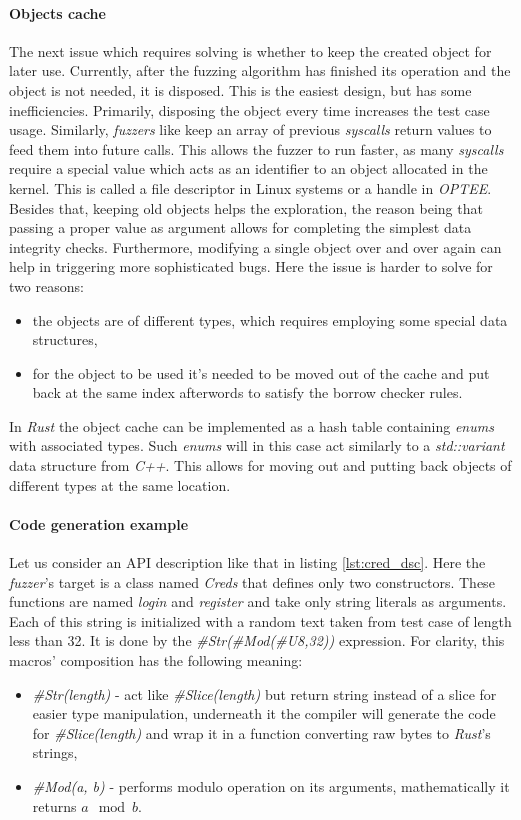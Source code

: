 \paragraph{Objects cache}
The next issue which requires solving is whether to keep the created object for later use. Currently, after the fuzzing algorithm has finished its operation and the object is not needed, it is disposed. This is the easiest design, but has some inefficiencies. Primarily, disposing the object every time increases the test case usage. Similarly, \textit{fuzzers} like \cite{opteefuzz} keep an array of previous \textit{syscalls} return values to feed them into future calls. This allows the fuzzer to run faster, as many \textit{syscalls} require a special value which acts as an identifier to an object allocated in the kernel. This is called a file descriptor in Linux systems or a handle in \textit{OPTEE}. Besides that, keeping old objects helps the exploration, the reason being that passing a proper value as argument allows for completing the simplest data integrity checks. Furthermore, modifying a single object over and over again can help in triggering more sophisticated bugs. Here the issue is harder to solve for two reasons:
\begin{itemize}
    \item the objects are of different types, which requires employing some special data structures,
    \item for the object to be used it's needed to be moved out of the cache and put back at the same index afterwords to satisfy the borrow checker rules.
\end{itemize}
In \textit{Rust} the object cache can be implemented as a hash table containing \textit{enums} with associated types. Such \textit{enums} will in this case act similarly to a \textit{std::variant} data structure from \textit{C++}. This allows for moving out and putting back objects of different types at the same location.


\paragraph{Code generation example}
Let us consider an API description like that in listing \ref{lst:cred_dsc}. Here the \textit{fuzzer}'s target is a class named \textit{Creds} that defines only two constructors. These functions are named \textit{login} and \textit{register} and take only string literals as arguments. Each of this string is initialized with a random text taken from test case of length less than 32. It is done by the \textit{\#Str(\#Mod(\#U8,32))} expression. For clarity, this macros' composition has the following meaning:
\begin{itemize}
    \item \textit{\#Str(length)} - act like \textit{\#Slice(length)} but return string instead of a slice for easier type manipulation, underneath it the compiler will generate the code for \textit{\#Slice(length)} and wrap it in a function converting raw bytes to \textit{Rust}'s strings,
    \item \textit{\#Mod(a, b)} - performs modulo operation on its arguments, mathematically it returns $a \mod b$.
\end{itemize}

